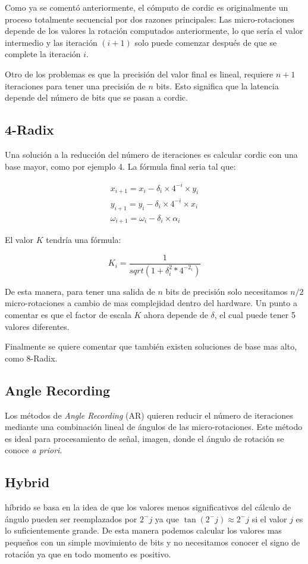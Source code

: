 Como ya se comentó anteriormente, el cómputo de \gls{cordic} es originalmente un proceso totalmente secuencial por dos razones principales: Las micro-rotaciones depende de los valores la rotación computados anteriormente, lo que sería el valor intermedio y las iteración $(i+1)$ solo puede comenzar después de que se complete la iteración $i$.

Otro de los problemas es que la precisión del valor final es lineal, requiere $n+1$ iteraciones para tener una precisión de $n$ bits. Esto significa que la latencia depende del número de bits que se pasan a \gls{cordic}.

\subsection{4-Radix}
Una solución a la reducción del número de iteraciones es calcular \gls{cordic} con una base mayor, como por ejemplo 4. La fórmula final seria tal que:

\[
\begin{matrix}
x_{i+1} = x_{i} - \delta_{i} \times 4^{-i} \times y_{i} \\
y_{i+1} = y_{i} - \delta_{i} \times 4^{-i} \times x_{i} \\
\omega_{i+1} =  \omega_{i} - \delta_{i} \times \alpha_{i}
\end{matrix}
\]

El valor $K$ tendría una fórmula:

\[
K_{i} = \frac{1}{sqrt{(1+\delta_i^2*4^{-2_{i}})}}
\]

De esta manera, para tener una salida de $n$ bits de precisión solo necesitamos $n/2$ micro-rotaciones a cambio de mas complejidad dentro del hardware. Un punto a comentar es que el factor de escala $K$ ahora depende de $\delta$, el cual puede tener 5 valores diferentes.

Finalmente se quiere comentar que también existen soluciones de base mas alto, como 8-Radix.

\subsection{Angle Recording}
Los métodos de \textit{Angle Recording} (AR) quieren reducir el número de iteraciones mediante una combinación lineal de ángulos de las micro-rotaciones. Este método es ideal para procesamiento de señal, imagen, donde el ángulo de rotación se conoce \textit{a priori}.

\subsection{Hybrid }
 híbrido se basa en la idea de que los valores menos significativos del cálculo de ángulo pueden ser reemplazados por $2^-j$ ya que $\tan(2^-j) \approx 2^-j $ si el valor $j$ es lo suficientemente grande. De esta manera podemos calcular los valores mas pequeños con un simple movimiento de bits y no necesitamos conocer el signo de rotación ya que en todo momento es positivo.

